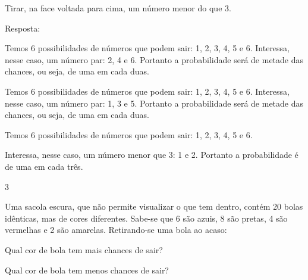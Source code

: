 {\begin{escolha}
\begin{escolha}

\item
  Tirar, na face voltada para cima, um número menor do que 3.
\end{escolha}


Resposta:

\begin{escolha}

\item
  Temos 6 possibilidades de números que podem sair: 1, 2, 3, 4, 5 e 6.
  Interessa, nesse caso, um número par: 2, 4 e 6. Portanto a probabilidade será de metade das chances, ou seja, de uma em cada duas.
\end{escolha}

\begin{escolha}

\item
  Temos 6 possibilidades de números que podem sair: 1, 2, 3, 4, 5 e 6.
  Interessa, nesse caso, um número par: 1, 3 e 5. Portanto a probabilidade será de metade das chances, ou seja, de uma em cada duas.
\end{escolha}



\begin{escolha}

\item
  Temos 6 possibilidades de números que podem sair: 1, 2, 3, 4, 5 e 6.
\end{escolha}

Interessa, nesse caso, um número menor que 3: 1 e 2. Portanto a probabilidade é de uma em cada três.


\num{3}

Uma sacola escura, que não permite visualizar o que tem dentro, contém
20 bolas idênticas, mas de cores diferentes. Sabe-se que 6 são azuis, 8
são pretas, 4 são vermelhas e 2 são amarelas. Retirando-se uma bola ao
acaso:

\begin{escolha}

\item
Qual cor de bola tem mais chances de sair?

\item
 Qual cor de bola tem menos chances de sair?
\end{escolha}


\end{escolha}}
